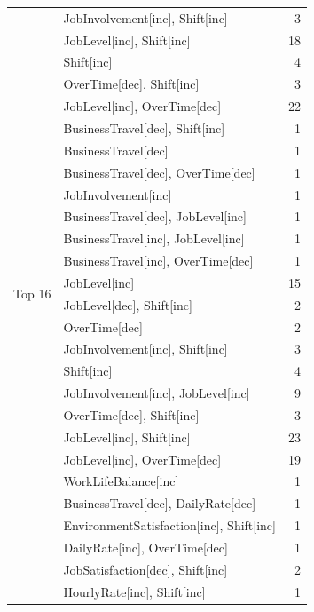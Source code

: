 \documentclass[a4paper,fleqn]{cas-sc}
\begin{document}
{\begin{longtable}{llr}
 & JobInvolvement[inc], Shift[inc]               & 3  \\
 & JobLevel[inc], Shift[inc]                    & 18 \\
 & Shift[inc]                                   & 4  \\
 & OverTime[dec], Shift[inc]                    & 3  \\
 & JobLevel[inc], OverTime[dec]                 & 22 \\
\midrule
\multirow{16}{*}{Top 16} & BusinessTravel[dec], Shift[inc]              & 1  \\
 & BusinessTravel[dec]                          & 1  \\
 & BusinessTravel[dec], OverTime[dec]           & 1  \\
 & JobInvolvement[inc]                          & 1  \\
 & BusinessTravel[dec], JobLevel[inc]           & 1  \\
 & BusinessTravel[inc], JobLevel[inc]           & 1  \\
 & BusinessTravel[inc], OverTime[dec]           & 1  \\
 & JobLevel[inc]                                & 15 \\
 & JobLevel[dec], Shift[inc]                    & 2  \\
 & OverTime[dec]                                & 2  \\
 & JobInvolvement[inc], Shift[inc]               & 3  \\
 & Shift[inc]                                   & 4  \\
 & JobInvolvement[inc], JobLevel[inc]           & 9  \\
 & OverTime[dec], Shift[inc]                    & 3  \\
 & JobLevel[inc], Shift[inc]                    & 23 \\
 & JobLevel[inc], OverTime[dec]                 & 19 \\
\midrule
 & WorkLifeBalance[inc]                   & 1 \\
 & BusinessTravel[dec], DailyRate[dec]                & 1 \\
 & EnvironmentSatisfaction[inc], Shift[inc]           & 1 \\
 & DailyRate[inc], OverTime[dec]                      & 1 \\
 & JobSatisfaction[dec], Shift[inc]                   & 2 \\
 & HourlyRate[inc], Shift[inc]                        & 1 \\

\end{longtable}}
\end{document}

